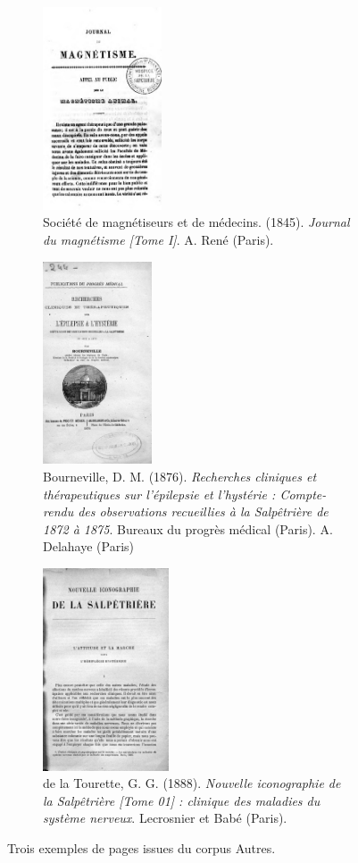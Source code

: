\begin{figure}[htp]
	\centering
	
	\begin{subfigure}[t]{0.3\textwidth}
		\centering
		\includegraphics[height=6cm]{img/magnetisme.jpg}
		\caption{Société de magnétiseurs et de médecins. (1845). \textit{Journal du magnétisme [Tome I]}. A. René (Paris).}
	\end{subfigure}\hfill
	\begin{subfigure}[t]{0.3\textwidth}
		\centering
		\includegraphics[height=6cm]{img/recherches_cliniques.jpg}
		\caption{Bourneville, D. M. (1876). \textit{Recherches cliniques et thérapeutiques sur l'épilepsie et l'hystérie : Compte-rendu des observations recueillies à la Salpêtrière de 1872 à 1875}. Bureaux du progrès médical (Paris). A. Delahaye (Paris)}
	\end{subfigure}\hfill
	\begin{subfigure}[t]{0.3\textwidth}
		\centering
		\includegraphics[height=6cm]{img/nouvelle_iconographie.jpg}
		\caption{de la Tourette, G. G. (1888). \textit{Nouvelle iconographie de la Salpêtrière [Tome 01] : clinique des maladies du système nerveux}. Lecrosnier et Babé (Paris).}
	\end{subfigure}
	
	\caption{Trois exemples de pages issues du corpus Autres.}
	\label{fig:autres_pages}
\end{figure}

